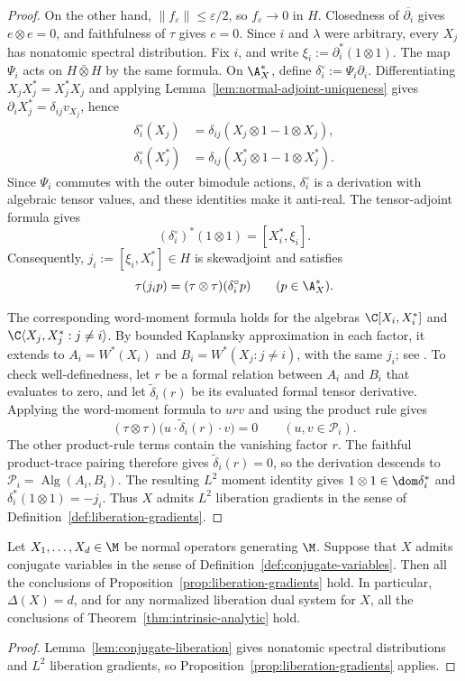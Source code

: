 \begin{proof}
On the other hand, $\|f_\varepsilon\|\leq\varepsilon/2$, so $f_\varepsilon\to0$ in $H$.
Closedness of $\overline{\partial_i}$ gives $e\otimes e=0$, and faithfulness of $\tau$ gives $e=0$.
Since $i$ and $\lambda$ were arbitrary, every $X_j$ has nonatomic spectral distribution.
Fix $i$, and write $\xi_i:=\partial_i^*(1\otimes1)$.
The map $\Psi_i$ acts on $H\bar\otimes H$ by the same formula.
On $\A_X^\ast$, define $\delta_i^\circ:=\Psi_i\partial_i$.
Differentiating $X_jX_j^*=X_j^*X_j$ and applying Lemma~\ref{lem:normal-adjoint-uniqueness} gives $\partial_iX_j^*=\delta_{ij}v_{X_j}$, hence
\[
 \begin{aligned}
  \delta_i^\circ(X_j)&=\delta_{ij}(X_j\otimes1-1\otimes X_j),\\
  \delta_i^\circ(X_j^*)&=\delta_{ij}(X_j^*\otimes1-1\otimes X_j^*).
 \end{aligned}
\]
Since $\Psi_i$ commutes with the outer bimodule actions, $\delta_i^\circ$ is a derivation with algebraic tensor values, and these identities make it anti-real.
The tensor-adjoint formula \cite[Lemma~4.3]{Mai15} gives
\[
 (\delta_i^\circ)^*(1\otimes1)=[X_i^*,\xi_i].
\]
Consequently, $j_i:=[\xi_i,X_i^*]\in H$ is skewadjoint and satisfies
\[
 \tau(j_ip)=(\tau\otimes\tau)(\delta_i^\circ p)
 \qquad(p\in\A_X^\ast).
\]

The corresponding word-moment formula holds for the algebras $\C[X_i,X_i^*]$ and $\C\langle X_j,X_j^*:j\ne i\rangle$.
By bounded Kaplansky approximation in each factor, it extends to $A_i=W^*(X_i)$ and $B_i=W^*(X_j:j\ne i)$, with the same $j_i$; see \cite[Remark~5.5(c)]{Voi99}.
To check well-definedness, let $r$ be a formal relation between $A_i$ and $B_i$ that evaluates to zero, and let $\widetilde\delta_i(r)$ be its evaluated formal tensor derivative.
Applying the word-moment formula to $urv$ and using the product rule gives
\[
 (\tau\otimes\tau)\bigl(u\cdot\widetilde\delta_i(r)\cdot v\bigr)=0
 \qquad(u,v\in\mathcal P_i).
\]
The other product-rule terms contain the vanishing factor $r$.
The faithful product-trace pairing therefore gives $\widetilde\delta_i(r)=0$, so the derivation descends to $\mathcal P_i=\operatorname{Alg}(A_i,B_i)$.
The resulting $L^2$ moment identity gives
$1\otimes1\in\dom\delta_i^*$ and $\delta_i^*(1\otimes1)=-j_i$.
Thus $X$ admits $L^2$ liberation gradients in the sense of Definition~\ref{def:liberation-gradients}.
\end{proof}

\begin{corollary}\label{prop:normal-conjugates}
Let $X_1,\ldots,X_d\in\M$ be normal operators generating $\M$.
Suppose that $X$ admits conjugate variables in the sense of Definition~\ref{def:conjugate-variables}.
Then all the conclusions of Proposition~\ref{prop:liberation-gradients} hold.
In particular, $\Delta(X)=d$, and for any normalized liberation dual system for $X$, all the conclusions of Theorem~\ref{thm:intrinsic-analytic} hold.
\end{corollary}
\begin{proof}
Lemma~\ref{lem:conjugate-liberation} gives nonatomic spectral distributions and $L^2$ liberation gradients, so Proposition~\ref{prop:liberation-gradients} applies.
\end{proof}

